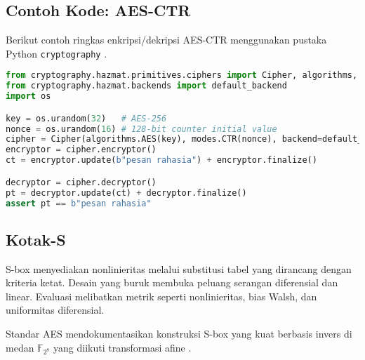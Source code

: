 \documentclass[../main.tex]{subfiles}
\begin{document}
\subsection{Contoh Kode: AES-CTR}
Berikut contoh ringkas enkripsi/dekripsi AES-CTR menggunakan pustaka Python \texttt{cryptography} \parencite{cryptography-symmetric-docs}.

\begin{lstlisting}[language=Python, caption={AES-CTR dengan cryptography}, label={lst:aesctr}]
from cryptography.hazmat.primitives.ciphers import Cipher, algorithms, modes
from cryptography.hazmat.backends import default_backend
import os

key = os.urandom(32)   # AES-256
nonce = os.urandom(16) # 128-bit counter initial value
cipher = Cipher(algorithms.AES(key), modes.CTR(nonce), backend=default_backend())
encryptor = cipher.encryptor()
ct = encryptor.update(b"pesan rahasia") + encryptor.finalize()

decryptor = cipher.decryptor()
pt = decryptor.update(ct) + decryptor.finalize()
assert pt == b"pesan rahasia"
\end{lstlisting}

\subsection{Kotak-S}
S-box menyediakan nonlinieritas melalui substitusi tabel yang dirancang dengan kriteria ketat. Desain yang buruk membuka peluang serangan diferensial dan linear. Evaluasi melibatkan metrik seperti nonlinieritas, bias Walsh, dan uniformitas diferensial.

Standar AES mendokumentasikan konstruksi S-box yang kuat berbasis invers di medan \(\mathbb{F}_{2^8}\) yang diikuti transformasi afine \parencite{fips197}.
\end{document}
